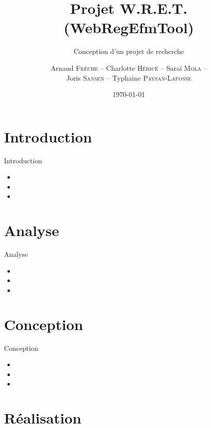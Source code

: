 \documentclass{beamer}
\title{\textcolor{bleu2}{\textbf{Projet W.R.E.T. (WebRegEfmTool)}}}
\subtitle{\textcolor{bleu1}{Conception d'un projet de recherche}}
\author[]{Arnaud \textsc{Frèche} -- Charlotte \textsc{Héricé} -- Saraï \textsc{Mola} -- \\ Joris \textsc{Sansen} -- Typhaine \textsc{Paysan-Lafosse}}
\institute{Master 2 BioInformatique}
\date{\today}
\begin{document}
\frame{\titlepage}
\frame{\tableofcontents}

\section{Introduction}

\begin{frame}{\textcolor{bleu2}{Introduction}}
	\begin{itemize}
	\item 
	\item 
	\item 
	\end{itemize}
\end{frame}

\section{Analyse}

\begin{frame}{\textcolor{bleu2}{Analyse}}
	\begin{itemize}
	\item 
	\item 
	\item 
	\end{itemize}
\end{frame}

\section{Conception}

\begin{frame}{\textcolor{bleu2}{Conception}}
	\begin{itemize}
	\item 
	\item 
	\item 
	\end{itemize}
\end{frame}

\section{Réalisation}
\end{document}

